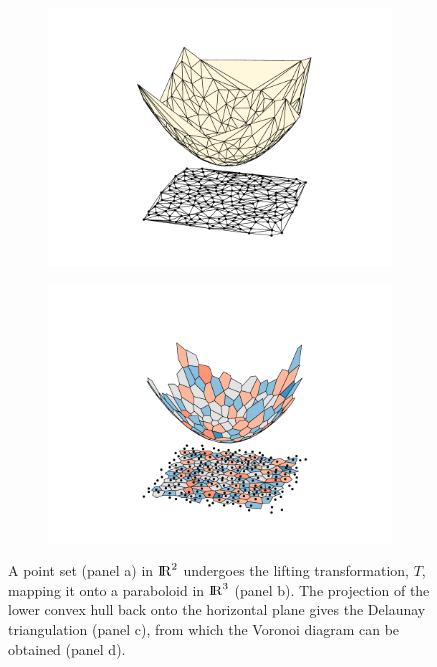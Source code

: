 \begin{figure}[bt]
       \begin{subfigure}[b]{0.4\textwidth}
         \centering
         \includegraphics[width=\textwidth]{./appendices/figures/power_3.pdf}
         \caption{}
         \label{appfig:vorconvexhull3}
     \end{subfigure}
     \hspace{1cm}
      \begin{subfigure}[b]{0.4\textwidth}
         \centering
         \includegraphics[width=\textwidth]{./appendices/figures/power_4.pdf}
         \caption{}
         \label{appfig:vorconvexhull4}
     \end{subfigure}

	\caption{A point set (panel a) in ${\rm I\!R}^2$ undergoes the lifting transformation, $T$, mapping it onto a paraboloid in ${\rm I\!R}^3$ (panel b). The projection of the lower convex hull back onto the horizontal plane gives the Delaunay triangulation (panel c), from which the Voronoi diagram can be obtained (panel d).}
	\label{appfig:vorconvexhull}
\end{figure}


